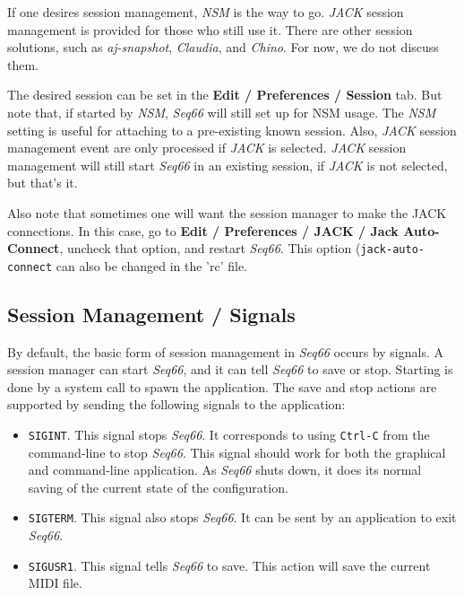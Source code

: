    If one desires session management, \textsl{NSM} is the way to go.
   \textsl{JACK} session management is provided for those who still use it.
   There are other session solutions, such as \textsl{aj-snapshot},
   \textsl{Claudia}, and \textsl{Chino}.
   For now, we do not discuss them.

   The desired session can be set in the \textbf{Edit / Preferences /
   Session} tab.  But note that, if started by \textsl{NSM}, \textsl{Seq66}
   will still set up for NSM usage.  The \textsl{NSM} setting is
   useful for attaching to a pre-existing known session.
   Also, \textsl{JACK} session management event are only processed
   if \textsl{JACK} is selected.
   \textsl{JACK} session management will still start \textsl{Seq66} in
   an existing session, if \textsl{JACK} is
   not selected, but that's it.

   Also note that sometimes one will want the session manager to make the JACK
   connections.  In this case, go to
   \textbf{Edit / Preferences / JACK / Jack Auto-Connect}, uncheck that option,
   and restart \textsl{Seq66}.  This option (\texttt{jack-auto-connect}
   can also be changed in the 'rc' file.

\subsection{Session Management / Signals}
\label{subsec:sessions_signals}

   By default, the basic form of session management in
   \textsl{Seq66} occurs by signals.  A
   session manager can start \textsl{Seq66}, and it can tell \textsl{Seq66} to
   save or stop.  Starting is done by a system call to spawn the application.
   The save and stop actions are supported by sending the following signals to
   the application:

   \begin{itemize}
      \item \texttt{SIGINT}.
         This signal stops \textsl{Seq66}. It corresponds
         to using \texttt{Ctrl-C} from the command-line to stop \textsl{Seq66}.
         This signal should work for both the graphical and command-line
         application.  As \textsl{Seq66} shuts down, it does its normal saving
         of the current state of the configuration.
      \item \texttt{SIGTERM}.
         This signal also stops \textsl{Seq66}.  It can
         be sent by an application to exit \textsl{Seq66}.
      \item \texttt{SIGUSR1}.
         This signal tells \textsl{Seq66} to save.  This
         action will save the current MIDI file.
   \end{itemize}

